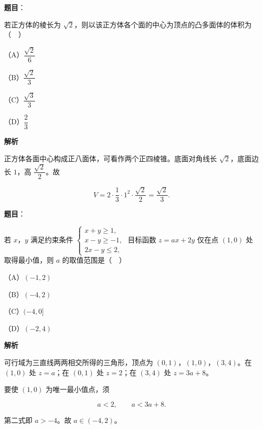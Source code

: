 \begin{answer}

\textbf{题目}：

若正方体的棱长为 $\sqrt2$，则以该正方体各个面的中心为顶点的凸多面体的体积为（　）

（A）$\dfrac{\sqrt2}6$

（B）$\dfrac{\sqrt2}3$

（C）$\dfrac{\sqrt3}3$

（D）$\dfrac23$

\textbf{解析}

正方体各面中心构成正八面体，可看作两个正四棱锥。底面对角线长 $\sqrt2$，底面边长 $1$，高 $\dfrac{\sqrt2}2$。故

\nopagebreak[4]
\[V=2\cdot\frac13\cdot1^2\cdot\frac{\sqrt2}2=\frac{\sqrt2}3.\]


\end{answer}
\begin{answer}

\textbf{题目}：

若 $x$，$y$ 满足约束条件 $\begin{cases}x+y\geqslant1,\\ x-y\geqslant-1,\\ 2x-y\leqslant2,\end{cases}$ 目标函数 $z=ax+2y$ 仅在点 $(1,0)$ 处取得最小值，则 $a$ 的取值范围是（　）

（A）$(-1,2)$

（B）$(-4,2)$

（C）$(-4,0]$

（D）$(-2,4)$

\textbf{解析}

可行域为三直线两两相交所得的三角形，顶点为 $(0,1)$，$(1,0)$，$(3,4)$。在 $(1,0)$ 处 $z=a$；在 $(0,1)$ 处 $z=2$；在 $(3,4)$ 处 $z=3a+8$。

要使 $(1,0)$ 为唯一最小值点，须

\nopagebreak[4]
\[a<2,\qquad a<3a+8.\]

第二式即 $a>-4$。故 $a\in(-4,2)$。


\end{answer}
